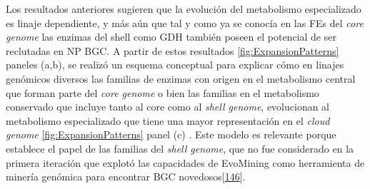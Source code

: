 \documentclass[12pt,twoside]{reedthesis}
\begin{document}
  Los resultados anteriores sugieren que la evolución del metabolismo
  especializado es linaje dependiente, y más aún que tal y como ya se
  conocía en las FEs del \emph{core genome} las enzimas del shell como GDH
  también poseen el potencial de ser reclutadas en NP BGC. A partir de
  estos resultados \autoref{fig:ExpansionPatterns} paneles (a,b), se
  realizó un esquema conceptual para explicar cómo en linajes genómicos
  diversos las familias de enzimas con origen en el metabolismo central
  que forman parte del \emph{core genome} o bien las familias en el
  metabolismo conservado que incluye tanto al core como al \emph{shell
  genome}, evolucionan al metabolismo especializado que tiene una mayor
  representación en el \emph{cloud genome} \autoref{fig:ExpansionPatterns}
  panel (c) . Este modelo es relevante porque establece el papel de las
  familias del \emph{shell genome}, que no fue considerado en la primera
  iteración que explotó las capacidades de EvoMining como herramienta de
  minería genómica para encontrar BGC
  novedosos{[}\protect\hyperlink{ref-navarro-munoz_computational_2018}{146}{]}.
  
\end{document}
